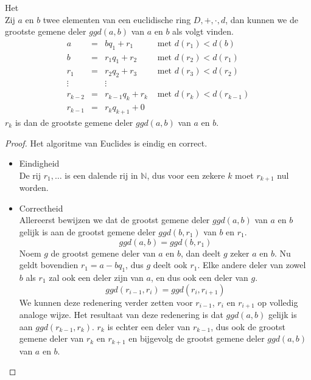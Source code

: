 \documentclass[main.tex]{subfiles}
\begin{document}
\begin{al}
  \label{al:algoritme-van-euclides}
  Het \\
  Zij $a$ en $b$ twee elementen van een euclidische ring $D,+,\cdot,d$, dan kunnen we de grootste gemene deler $ggd(a,b)$ van $a$ en $b$ als volgt vinden.
  \[
  \begin{array}{rcll}
    a &=& bq_{1} + r_{1} &\text{ met } d(r_{1}) < d(b) \\
    b &=& r_{1}q_{1} + r_{2} &\text{ met } d(r_{2}) < d(r_{1}) \\
    r_{1} &=& r_{2}q_{2} + r_{3} &\text{ met } d(r_{3}) < d(r_{2}) \\
    \vdots && \vdots \\
    r_{k-2} &=& r_{k-1}q_{k} + r_{k} &\text{ met } d(r_{k}) < d(r_{k-1}) \\
    r_{k-1} &=& r_{k}q_{k+1} + 0
  \end{array}
  \]
  $r_{k}$ is dan de grootste gemene deler $ggd(a,b)$ van $a$ en $b$.
  \begin{proof}
    Het algoritme van Euclides is eindig en correct.
    \begin{itemize}
    \item Eindigheid\\
      De rij $r_{1},\dotsc$ is een dalende rij in $\mathbb{N}$, dus voor een zekere $k$ moet $r_{k+1}$ nul worden.
    \item Correctheid\\
      Allereerst bewijzen we dat de grootst gemene deler $ggd(a,b)$ van $a$ en $b$ gelijk is aan de grootst gemene deler $ggd(b,r_{1})$ van $b$ en $r_{1}$.
      \[ ggd(a,b) = ggd(b,r_{1}) \]
      Noem $g$ de grootst gemene deler van $a$ en $b$, dan deelt $g$ zeker $a$ en $b$.
      Nu geldt bovendien $r_{1} = a - bq_{1}$, dus $g$ deelt ook $r_{1}$.
      Elke andere deler van zowel $b$ als $r_{1}$ zal ook een deler zijn van $a$, en dus ook een deler van $g$.
      \[ ggd(r_{i-1},r_{i}) = ggd(r_{i},r_{i+1}) \]
      We kunnen deze redenering verder zetten voor $r_{i-1}$, $r_{i}$ en $r_{i+1}$ op volledig analoge wijze.
      Het resultaat van deze redenering is dat $ggd(a,b)$ gelijk is aan $ggd(r_{k-1},r_{k})$.
      $r_{k}$ is echter een deler van $r_{k-1}$, dus ook de grootst gemene deler van $r_{k}$ en $r_{k+1}$ en bijgevolg de grootst gemene deler $ggd(a,b)$ van $a$ en $b$.
    \end{itemize}
  \end{proof}
\end{al}
\end{document}
